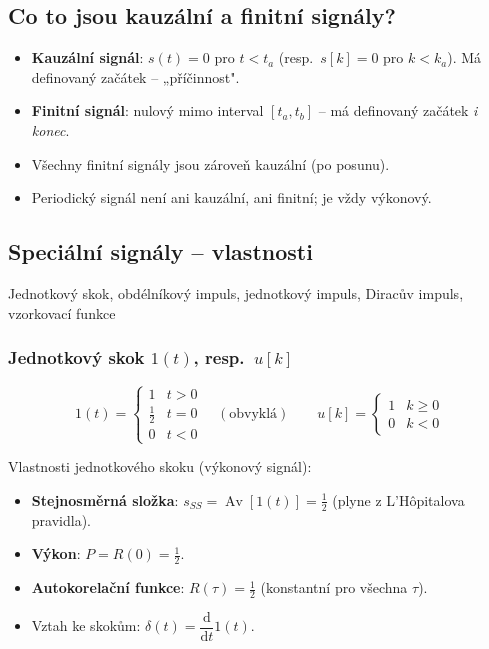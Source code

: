 \documentclass[12pt,a4paper]{article}
\newcommand{\Av}{\operatorname{Av}}
\newcommand{\dd}{\mathrm{d}}
\begin{document}
\subsection*{Co to jsou kauzální a finitní signály?}

\begin{itemize}
  \item \textbf{Kauzální signál}: $s(t) = 0$ pro $t < t_a$ (resp.\ $s[k]=0$ pro $k < k_a$). Má definovaný začátek – „příčinnost".
  \item \textbf{Finitní signál}: nulový mimo interval $[t_a, t_b]$ – má definovaný začátek \emph{i konec}.
  \item Všechny finitní signály jsou zároveň kauzální (po posunu).
  \item Periodický signál není ani kauzální, ani finitní; je vždy výkonový.
\end{itemize}

\begin{hvezdBox}
\subsection*{Speciální signály – vlastnosti}
Jednotkový skok, obdélníkový impuls, jednotkový impuls, Diracův impuls, vzorkovací funkce
\end{hvezdBox}

\subsubsection*{Jednotkový skok $1(t)$, resp.\ $u[k]$}

\begin{matBox}
\[
  1(t) = \begin{cases} 1 & t > 0 \\ \tfrac{1}{2} & t = 0 \\ 0 & t < 0 \end{cases}
  \quad(\text{obvyklá})
  \qquad
  u[k] = \begin{cases} 1 & k \geq 0 \\ 0 & k < 0 \end{cases}
\]
\end{matBox}

Vlastnosti jednotkového skoku (výkonový signál):
\begin{itemize}
  \item \textbf{Stejnosměrná složka}: $s_{SS} = \Av[1(t)] = \tfrac{1}{2}$ (plyne z L'Hôpitalova pravidla).
  \item \textbf{Výkon}: $P = R(0) = \tfrac{1}{2}$.
  \item \textbf{Autokorelační funkce}: $R(\tau) = \tfrac{1}{2}$ (konstantní pro všechna $\tau$).
  \item Vztah ke skokům: $\delta(t) = \dfrac{\dd}{\dd t}1(t)$.
\end{itemize}
\end{document}
